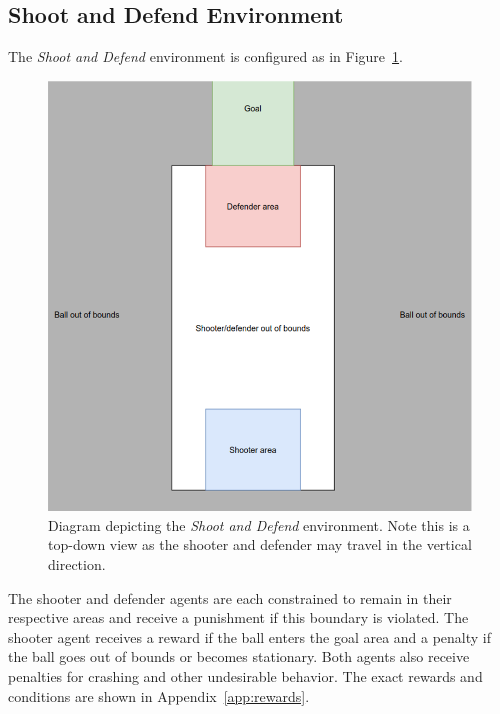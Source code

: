 \documentclass{article}
\begin{document}
\subsection{Shoot and Defend Environment}\label{subsec:sad_env}
The \textit{Shoot and Defend} environment is configured as in Figure~\ref{fig:sad_env}. 
\begin{figure}[t!]
  \includegraphics[width=\linewidth]{imgs/ShootAndDefend_env}
  \caption{Diagram depicting the \textit{Shoot and Defend} environment. Note this is a top-down view as the shooter and defender may travel in the vertical direction.}
  \label{fig:sad_env}
\end{figure}
The shooter and defender agents are each constrained to remain in their respective areas and receive a punishment if this boundary is violated. 
The shooter agent receives a reward if the ball enters the goal area and a penalty if the ball goes out of bounds or becomes stationary. 
Both agents also receive penalties for crashing and other undesirable behavior. 
The exact rewards and conditions are shown in Appendix~\ref{app:rewards}. \\
\end{document}
